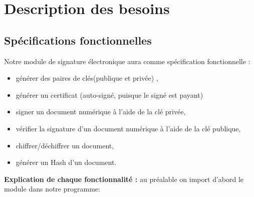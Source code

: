 \documentclass[12pt,a4paper]{article}
\begin{document}
\section{Description des besoins}

	\subsection{Spécifications fonctionnelles}
	
	Notre module de signature électronique aura comme spécification fonctionnelle :
	
	\begin{itemize}
		\item générer des paires de clés(publique et privée) ,
		\item générer un certificat (auto-signé, puisque le signé est payant)
		\item signer un document numérique à l'aide de la clé privée,
		\item vérifier la signature d'un document numérique à l'aide de la clé publique,
		\item chiffrer/déchiffrer un document,
		\item générer un Hash d'un document.\\
	\end{itemize}
	
	\textbf{Explication de chaque fonctionnalité : } au préalable on import d'abord le module dans notre programme:\\
	
\end{document}
